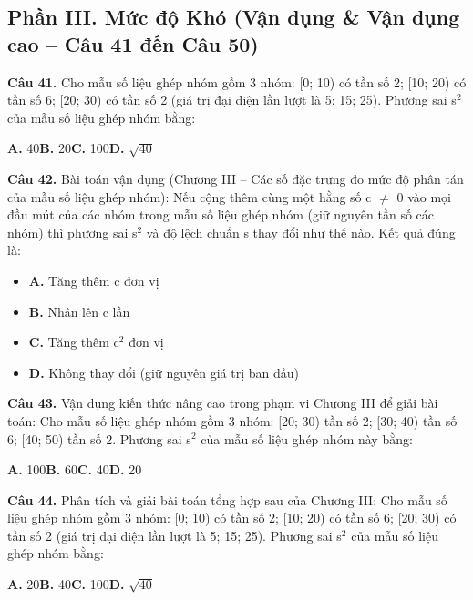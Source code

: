 \documentclass[11pt,a4paper]{article}
\begin{document}
\subsection*{\color{accent} Phần III. Mức độ Khó (Vận dụng \& Vận dụng cao -- Câu 41 đến Câu 50)}
\textbf{\color{primary} Câu 41.} Cho mẫu số liệu ghép nhóm gồm 3 nhóm: [0; 10) có tần số 2; [10; 20) có tần số 6; [20; 30) có tần số 2 (giá trị đại diện lần lượt là 5; 15; 25). Phương sai s$^2$ của mẫu số liệu ghép nhóm bằng:\par
\hspace*{1.5em}\textbf{A.} 40\quad\quad \textbf{B.} 20\quad\quad \textbf{C.} 100\quad\quad \textbf{D.} $\sqrt{40}$\par\vspace{2pt}
\textbf{\color{primary} Câu 42.} Bài toán vận dụng (Chương III – Các số đặc trưng đo mức độ phân tán của mẫu số liệu ghép nhóm): Nếu cộng thêm cùng một hằng số c $\ne$ 0 vào mọi đầu mút của các nhóm trong mẫu số liệu ghép nhóm (giữ nguyên tần số các nhóm) thì phương sai s$^2$ và độ lệch chuẩn s thay đổi như thế nào. Kết quả đúng là:\par
\begin{itemize}\setlength{\itemsep}{1pt}\setlength{\parskip}{0pt}
  \item[] \textbf{A.} Tăng thêm c đơn vị
  \item[] \textbf{B.} Nhân lên c lần
  \item[] \textbf{C.} Tăng thêm c$^2$ đơn vị
  \item[] \textbf{D.} Không thay đổi (giữ nguyên giá trị ban đầu)
\end{itemize}\vspace{2pt}
\textbf{\color{primary} Câu 43.} Vận dụng kiến thức nâng cao trong phạm vi Chương III để giải bài toán: Cho mẫu số liệu ghép nhóm gồm 3 nhóm: [20; 30) tần số 2; [30; 40) tần số 6; [40; 50) tần số 2. Phương sai s$^2$ của mẫu số liệu ghép nhóm này bằng:\par
\hspace*{1.5em}\textbf{A.} 100\quad\quad \textbf{B.} 60\quad\quad \textbf{C.} 40\quad\quad \textbf{D.} 20\par\vspace{2pt}
\textbf{\color{primary} Câu 44.} Phân tích và giải bài toán tổng hợp sau của Chương III: Cho mẫu số liệu ghép nhóm gồm 3 nhóm: [0; 10) có tần số 2; [10; 20) có tần số 6; [20; 30) có tần số 2 (giá trị đại diện lần lượt là 5; 15; 25). Phương sai s$^2$ của mẫu số liệu ghép nhóm bằng:\par
\hspace*{1.5em}\textbf{A.} 20\quad\quad \textbf{B.} 40\quad\quad \textbf{C.} 100\quad\quad \textbf{D.} $\sqrt{40}$\par\vspace{2pt}
\end{document}
